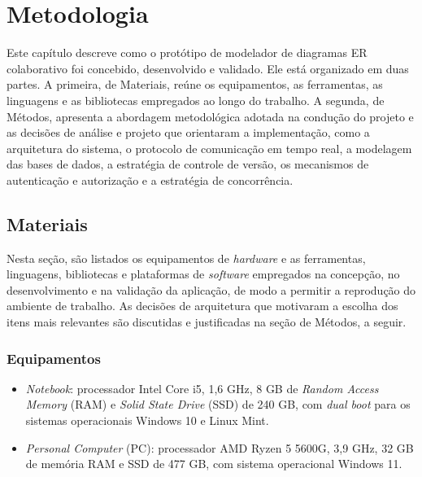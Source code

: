 \chapter{Metodologia}

Este capítulo descreve como o protótipo de modelador de diagramas ER colaborativo foi concebido, desenvolvido e validado. Ele está organizado em duas partes. A primeira, de Materiais, reúne os equipamentos, as ferramentas, as linguagens e as bibliotecas empregados ao longo do trabalho. A segunda, de Métodos, apresenta a abordagem metodológica adotada na condução do projeto e as decisões de análise e projeto que orientaram a implementação, como a arquitetura do sistema, o protocolo de comunicação em tempo real, a modelagem das bases de dados, a estratégia de controle de versão, os mecanismos de autenticação e autorização e a estratégia de concorrência.

\section[Materiais]{Materiais}

Nesta seção, são listados os equipamentos de \textit{hardware} e as ferramentas, linguagens, bibliotecas e plataformas de \textit{software} empregados na concepção, no desenvolvimento e na validação da aplicação, de modo a permitir a reprodução do ambiente de trabalho. As decisões de arquitetura que motivaram a escolha dos itens mais relevantes são discutidas e justificadas na seção de Métodos, a seguir.

\subsection[Equipamentos]{Equipamentos}
\label{subsec:equipamentos}

\begin{itemize}
    \item \textit{Notebook}: processador Intel Core i5, 1,6 GHz, 8 GB de \textit{Random Access Memory} (RAM) e \textit{Solid State Drive} (SSD) de 240 GB, com \textit{dual boot} para os sistemas operacionais Windows 10 e Linux Mint.
    \item \textit{Personal Computer} (PC): processador AMD Ryzen 5 5600G, 3,9 GHz, 32 GB de memória RAM e SSD de 477 GB, com sistema operacional Windows 11.
\end{itemize}

